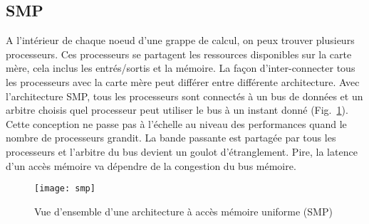 \subsection{SMP}
A l'intérieur de chaque noeud d'une grappe de calcul, on peux trouver plusieurs processeurs.
%
Ces processeurs se partagent les ressources disponibles sur la carte mère, cela inclus les entrés/sortis et la mémoire.
%
La façon d'inter-connecter tous les processeurs avec la carte mère peut différer entre différente architecture.
%
Avec l'architecture SMP, tous les processeurs sont connectés à un bus de données et un arbitre choisis quel processeur peut utiliser le bus à un instant donné (Fig.~\ref{fig:smp}).
%
Cette conception ne passe pas à l'échelle au niveau des performances quand le nombre de processeurs grandit.
%
La bande passante est partagée par tous les processeurs et l'arbitre du bus devient un goulot d'étranglement.
%
Pire, la latence d'un accès mémoire va dépendre de la congestion du bus mémoire.

\begin{figure}[!ht]
        \centering
        \texttt{[image: smp]}
        \caption{Vue d'ensemble d'une architecture à accès mémoire uniforme (SMP)}
        \label{fig:smp}
\end{figure}
